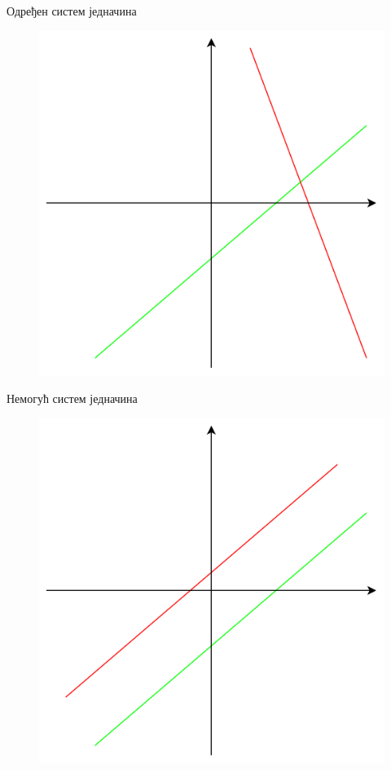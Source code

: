 \documentclass[xcolor=table]{beamer}
\begin{document}
    \begin{frame}{Одређен систем једначина}
        \begin{figure}
            \centering
            \includegraphics[width=\textwidth,height=0.8\textheight,keepaspectratio]{images/moguc_jed.png}
        \end{figure}
    \end{frame}
    
   \begin{frame}{Немогућ систем једначина}
        \begin{figure}
            \centering
            \includegraphics[width=\textwidth,height=0.8\textheight,keepaspectratio]{images/nemoguc_jed.png}
        \end{figure}
    \end{frame}
    
\end{document}
